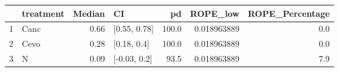 \begin{table}[ht]
\centering
\begin{tabular}{llrlrrr}
  \hline
 & treatment & Median & CI & pd & ROPE\_low & ROPE\_Percentage \\ 
  \hline
1 & Canc & 0.66 & [0.55, 0.78] & 100.0 & 0.018963889 & 0.0 \\ 
  2 & Cevo & 0.28 & [0.18, 0.4] & 100.0 & 0.018963889 & 0.0 \\ 
  3 & N & 0.09 & [-0.03, 0.2] & 93.5 & 0.018963889 & 7.9 \\ 
   \hline
\end{tabular}
\end{table}

